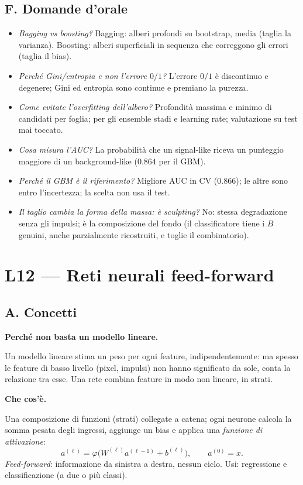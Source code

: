 \documentclass[11pt,a4paper]{article}
\newcommand{\dom}[1]{\par\smallskip\noindent\textbf{#1}\par\nopagebreak}
\begin{document}
\subsection*{F. Domande d'orale}
\begin{itemize}
\item \emph{Bagging vs boosting?} Bagging: alberi profondi su bootstrap, media (taglia la varianza). Boosting: alberi superficiali in sequenza che correggono gli errori (taglia il bias).
\item \emph{Perch\'e Gini/entropia e non l'errore $0/1$?} L'errore $0/1$ \`e discontinuo e degenere; Gini ed entropia sono continue e premiano la purezza.
\item \emph{Come evitate l'overfitting dell'albero?} Profondit\`a massima e minimo di candidati per foglia; per gli ensemble stadi e learning rate; valutazione su test mai toccato.
\item \emph{Cosa misura l'AUC?} La probabilit\`a che un signal-like riceva un punteggio maggiore di un background-like ($0.864$ per il GBM).
\item \emph{Perch\'e il GBM \`e il riferimento?} Migliore AUC in CV ($0.866$); le altre sono entro l'incertezza; la scelta non usa il test.
\item \emph{Il taglio cambia la forma della massa: \`e sculpting?} No: stessa degradazione senza gli impulsi; \`e la composizione del fondo (il classificatore tiene i $B$ genuini, anche parzialmente ricostruiti, e toglie il combinatorio).
\end{itemize}

\clearpage
\section{L12 --- Reti neurali feed-forward}
\subsection*{A. Concetti}

\dom{Perch\'e non basta un modello lineare.} Un modello lineare stima un peso per ogni feature, indipendentemente: ma spesso le feature di basso livello (pixel, impulsi) non hanno significato da sole, conta la relazione tra esse. Una rete combina feature in modo non lineare, in strati.

\dom{Che cos'\`e.} Una composizione di funzioni (strati) collegate a catena; ogni neurone calcola la somma pesata degli ingressi, aggiunge un bias e applica una \emph{funzione di attivazione}:
\[
a^{(\ell)}=\varphi\big(W^{(\ell)}a^{(\ell-1)}+b^{(\ell)}\big),\qquad a^{(0)}=x .
\]
\emph{Feed-forward}: informazione da sinistra a destra, nessun ciclo. Usi: regressione e classificazione (a due o pi\`u classi).
\end{document}
